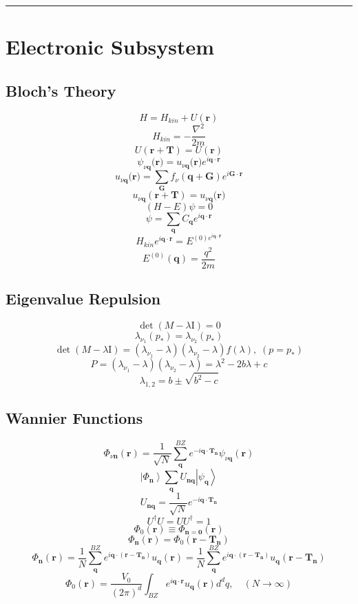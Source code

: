 \documentclass[12pt]{extarticle}
\newcommand{\parentheses}[1]{\ensuremath{\left( #1 \right)}}
\newcommand{\ket}[1]{\left| #1 \right\rangle}
\newcommand{\mysection}[1]{
\vspace{1mm}
\hrule
\section{\Huge{#1}}}
\begin{document}
\begin{multicols*}{2}
\mysection{Electronic Subsystem}
\subsection{Bloch's Theory}
$$H= H_{kin}+U(\mathbf{r})$$
$$H_{kin}= -\dfrac{\nabla^ 2}{2m}$$
$$U(\mathbf{r}+\mathbf{T})=U(\mathbf{r})$$
$$\psi_{\nu \mathbf{q}}(\mathbf{r)}= u_{\nu \mathbf{q}}(\mathbf{r)} e^{i \mathbf{q} \cdot \mathbf{r}}$$
$$u_{\nu \mathbf{q}}(\mathbf{r)} = \sum_{\mathbf{G}} f_\nu \parentheses{\mathbf{q}+\mathbf{G}} e^{i \mathbf{G} \cdot \mathbf{r}}$$
$$u_{\nu \mathbf{q}}(\mathbf{r}+\mathbf{T}) = u_{\nu \mathbf{q}}(\mathbf{r)}$$
$$(H-E)\psi=0$$
$$\psi=\sum_{\mathbf{q}}C_{\mathbf{q}}e^{i \mathbf{q}\cdot \mathbf{r}}$$
$$H_{kin} e^{i \mathbf{q}\cdot \mathbf{r}} = E^{(0)e^{i \mathbf{q}\cdot \mathbf{r}}}$$
$$E^{(0)}(\mathbf{q})=\dfrac{q^2}{2m}$$

\subsection{Eigenvalue Repulsion}
$$\det \parentheses{M-\lambda \mathrm{I}}=0$$
$$\lambda_{\nu_1}(p_*)=\lambda_{\nu_2}(p_*)$$
$$\det \parentheses{M-\lambda \mathrm{I}}=(\lambda_{\nu_1}-\lambda)(\lambda_{\nu_2}-\lambda)f(\lambda), \; (p=p_*)$$
$$P=(\lambda_{\nu_1}-\lambda)(\lambda_{\nu_2}-\lambda)=\lambda^2-2b\lambda+c$$
$$\lambda_{1,2}=b\pm \sqrt{b^2-c}$$

\subsection{Wannier Functions}
$$\Phi_{\nu \mathbf{n}}(\mathbf{r})=\dfrac{1}{\sqrt{N}} \sum_{\mathbf{q}}^{BZ} e^{-i \mathbf{q} \cdot \mathbf{T}_{\mathbf{n}}} \psi_{\nu \mathbf{q}}(\mathbf{r})$$
$$\ket{\Phi_{\mathbf{n}}} \sum_{\mathbf{q}} U_{\mathbf{nq}} \ket{\psi_{\mathbf{q}}}$$
$$U_{\mathbf{nq}}=\dfrac{1}{\sqrt{N}}e^{-i \mathbf{q} \cdot \mathbf{T}_{\mathbf{n}}}$$
$$U^\dagger U = U U^\dagger = 1$$
$$\Phi_{0}(\mathbf{r}) \equiv \Phi_{\mathbf{n=0}}(\mathbf{r})$$
$$\Phi_{\mathbf{n}}(\mathbf{r})=\Phi_{0}(\mathbf{r}-\mathbf{T_{n}})$$
$$\Phi_{\mathbf{n}}(\mathbf{r})= \dfrac{1}{N}\sum_{\mathbf{q}}^{BZ} e^{i \mathbf{q} \cdot (\mathbf{r}-\mathbf{T_{n}})} u_{\mathbf{q}}(\mathbf{r})= \dfrac{1}{N}\sum_{\mathbf{q}}^{BZ} e^{i \mathbf{q} \cdot (\mathbf{r}-\mathbf{T_{n}})} u_{\mathbf{q}}(\mathbf{r}-\mathbf{T_n})$$
$$\Phi_{0}(\mathbf{r})=\dfrac{V_0}{(2\pi)^d} \int_{BZ} e^{i \mathbf{q} \cdot \mathbf{r}} u_{\mathbf{q}}(\mathbf{r}) d^dq, \quad (N \rightarrow \infty)$$


\end{multicols*}
\end{document}
